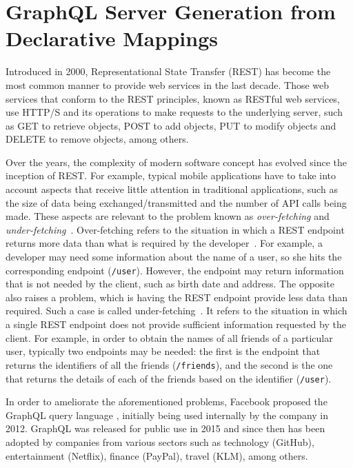\section{GraphQL Server Generation from Declarative Mappings}
\label{chap6_morphgraphql}
Introduced in 2000, Representational State Transfer (REST) has become the most common manner to provide web services in the last decade. Those web services that conform to the REST principles, known as RESTful web services, use HTTP/S and its operations to make requests to the underlying server, such as GET to retrieve objects, POST to add objects, PUT to modify objects and DELETE to remove objects, among others.

Over the years, the complexity of modern software concept has evolved since the inception of REST. For example, typical mobile applications have to take into account aspects that receive little attention in traditional applications, such as the size of data being exchanged/transmitted and the number of API calls being made. These aspects are relevant to the problem known as \textit{over-fetching} and \textit{under-fetching}~\citep{bryant2017graphql,vogel2017experiences,mukhiya2019graphql}. Over-fetching refers to the situation in which a REST endpoint returns more data than what is required by the developer~\citep{bryant2017graphql,vogel2017experiences,mukhiya2019graphql}. For example, a developer may need some information about the name of a user, so she hits the corresponding endpoint (\texttt{/user}). However, the endpoint may return information that is not needed by the client, such as birth date and address. The opposite also raises a problem, which is having the REST endpoint provide less data than required. Such a case is called under-fetching~\citep{bryant2017graphql,vogel2017experiences,mukhiya2019graphql}. It refers to the situation in which a single REST endpoint does not provide sufficient information requested by the client. For example, in order to obtain the names of all friends of a particular user, typically two endpoints may be needed: the first is the endpoint that returns the identifiers of all the friends (\texttt{/friends}), and the second is the one that returns the details of each of the friends based on the identifier (\texttt{/user}).

In order to ameliorate the aforementioned problems, Facebook proposed the GraphQL query language \citep{graphql}, initially being used internally by the company in 2012. GraphQL was released for public use in 2015 and since then has been adopted by companies from various sectors such as technology (GitHub), entertainment (Netflix), finance (PayPal), travel (KLM), among others. 

